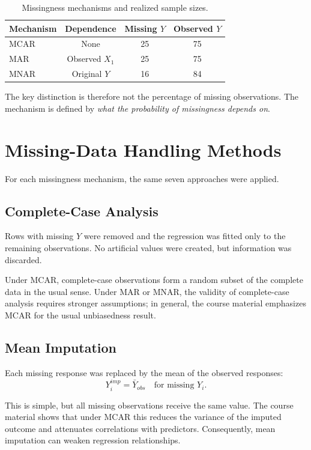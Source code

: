 \documentclass[11pt,a4paper]{article}
\begin{document}
\begin{table}[H]
\centering
\caption{Missingness mechanisms and realized sample sizes.}
\begin{tabular}{lccc}
\toprule
Mechanism & Dependence & Missing $Y$ & Observed $Y$\\
\midrule
MCAR & None & 25 & 75\\
MAR & Observed $X_1$ & 25 & 75\\
MNAR & Original $Y$ & 16 & 84\\
\bottomrule
\end{tabular}
\end{table}

The key distinction is therefore not the percentage of missing observations. The mechanism is defined by \textit{what the probability of missingness depends on}.

\section{Missing-Data Handling Methods}
For each missingness mechanism, the same seven approaches were applied.

\subsection{Complete-Case Analysis}
Rows with missing $Y$ were removed and the regression was fitted only to the remaining observations. No artificial values were created, but information was discarded.

Under MCAR, complete-case observations form a random subset of the complete data in the usual sense. Under MAR or MNAR, the validity of complete-case analysis requires stronger assumptions; in general, the course material emphasizes MCAR for the usual unbiasedness result.

\subsection{Mean Imputation}
Each missing response was replaced by the mean of the observed responses:
\[
Y_i^{imp}=\bar Y_{obs}
\quad\text{for missing }Y_i.
\]

This is simple, but all missing observations receive the same value. The course material shows that under MCAR this reduces the variance of the imputed outcome and attenuates correlations with predictors. Consequently, mean imputation can weaken regression relationships.
\end{document}
